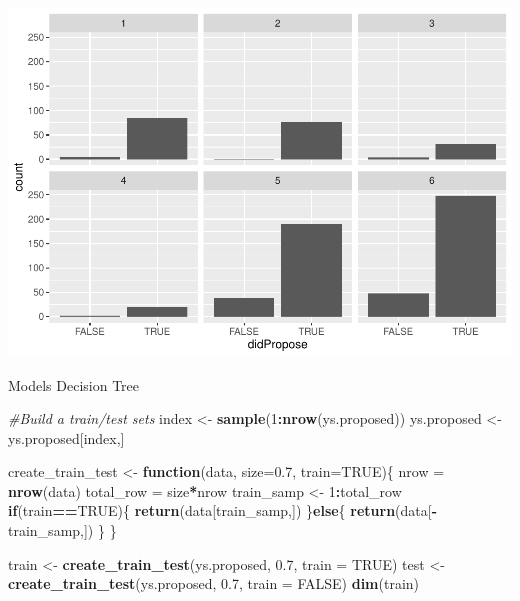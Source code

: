 \documentclass[]{article}
\newenvironment{Shaded}{\begin{snugshade}}{\end{snugshade}}
\newcommand{\CommentTok}[1]{\textcolor[rgb]{0.56,0.35,0.01}{\textit{#1}}}
\newcommand{\ControlFlowTok}[1]{\textcolor[rgb]{0.13,0.29,0.53}{\textbf{#1}}}
\newcommand{\DataTypeTok}[1]{\textcolor[rgb]{0.13,0.29,0.53}{#1}}
\newcommand{\DecValTok}[1]{\textcolor[rgb]{0.00,0.00,0.81}{#1}}
\newcommand{\FloatTok}[1]{\textcolor[rgb]{0.00,0.00,0.81}{#1}}
\newcommand{\KeywordTok}[1]{\textcolor[rgb]{0.13,0.29,0.53}{\textbf{#1}}}
\newcommand{\NormalTok}[1]{#1}
\newcommand{\OperatorTok}[1]{\textcolor[rgb]{0.81,0.36,0.00}{\textbf{#1}}}
\newcommand{\OtherTok}[1]{\textcolor[rgb]{0.56,0.35,0.01}{#1}}
\newcommand{\StringTok}[1]{\textcolor[rgb]{0.31,0.60,0.02}{#1}}
\begin{document}
\begin{Shaded}
\end{Shaded}

\includegraphics{ProposalAnalysis_files/figure-latex/unnamed-chunk-9-7.pdf}

Models Decision Tree

\begin{Shaded}
\begin{Highlighting}[]
\CommentTok{#Build a train/test sets}
\NormalTok{index <-}\StringTok{ }\KeywordTok{sample}\NormalTok{(}\DecValTok{1}\OperatorTok{:}\KeywordTok{nrow}\NormalTok{(ys.proposed))}
\NormalTok{ys.proposed <-}\StringTok{ }\NormalTok{ys.proposed[index,]}

\NormalTok{create_train_test <-}\StringTok{ }\ControlFlowTok{function}\NormalTok{(data, }\DataTypeTok{size=}\FloatTok{0.7}\NormalTok{, }\DataTypeTok{train=}\OtherTok{TRUE}\NormalTok{)\{}
\NormalTok{  nrow =}\StringTok{ }\KeywordTok{nrow}\NormalTok{(data)}
\NormalTok{  total_row =}\StringTok{ }\NormalTok{size}\OperatorTok{*}\NormalTok{nrow}
\NormalTok{  train_samp <-}\StringTok{ }\DecValTok{1}\OperatorTok{:}\NormalTok{total_row}
  \ControlFlowTok{if}\NormalTok{(train}\OperatorTok{==}\OtherTok{TRUE}\NormalTok{)\{}
    \KeywordTok{return}\NormalTok{(data[train_samp,])}
\NormalTok{  \}}\ControlFlowTok{else}\NormalTok{\{}
    \KeywordTok{return}\NormalTok{(data[}\OperatorTok{-}\NormalTok{train_samp,])}
\NormalTok{  \}}
\NormalTok{\}}

\NormalTok{train <-}\StringTok{ }\KeywordTok{create_train_test}\NormalTok{(ys.proposed, }\FloatTok{0.7}\NormalTok{, }\DataTypeTok{train =} \OtherTok{TRUE}\NormalTok{)}
\NormalTok{test <-}\StringTok{ }\KeywordTok{create_train_test}\NormalTok{(ys.proposed, }\FloatTok{0.7}\NormalTok{, }\DataTypeTok{train =} \OtherTok{FALSE}\NormalTok{)}
\KeywordTok{dim}\NormalTok{(train)}
\end{Highlighting}
\end{Shaded}
\end{document}
